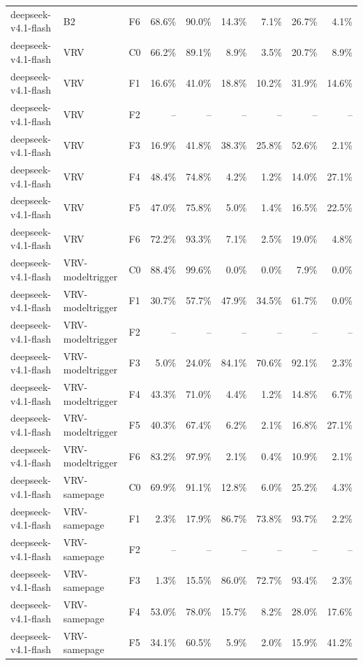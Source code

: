 \begin{tabular}{lllrrrrrr}
deepseek-v4.1-flash & B2 & F6 & 68.6\% & 90.0\% & 14.3\% & 7.1\% & 26.7\% & 4.1\% \\
deepseek-v4.1-flash & VRV & C0 & 66.2\% & 89.1\% & 8.9\% & 3.5\% & 20.7\% & 8.9\% \\
deepseek-v4.1-flash & VRV & F1 & 16.6\% & 41.0\% & 18.8\% & 10.2\% & 31.9\% & 14.6\% \\
deepseek-v4.1-flash & VRV & F2 & -- & -- & -- & -- & -- & -- \\
deepseek-v4.1-flash & VRV & F3 & 16.9\% & 41.8\% & 38.3\% & 25.8\% & 52.6\% & 2.1\% \\
deepseek-v4.1-flash & VRV & F4 & 48.4\% & 74.8\% & 4.2\% & 1.2\% & 14.0\% & 27.1\% \\
deepseek-v4.1-flash & VRV & F5 & 47.0\% & 75.8\% & 5.0\% & 1.4\% & 16.5\% & 22.5\% \\
deepseek-v4.1-flash & VRV & F6 & 72.2\% & 93.3\% & 7.1\% & 2.5\% & 19.0\% & 4.8\% \\
deepseek-v4.1-flash & VRV-modeltrigger & C0 & 88.4\% & 99.6\% & 0.0\% & 0.0\% & 7.9\% & 0.0\% \\
deepseek-v4.1-flash & VRV-modeltrigger & F1 & 30.7\% & 57.7\% & 47.9\% & 34.5\% & 61.7\% & 0.0\% \\
deepseek-v4.1-flash & VRV-modeltrigger & F2 & -- & -- & -- & -- & -- & -- \\
deepseek-v4.1-flash & VRV-modeltrigger & F3 & 5.0\% & 24.0\% & 84.1\% & 70.6\% & 92.1\% & 2.3\% \\
deepseek-v4.1-flash & VRV-modeltrigger & F4 & 43.3\% & 71.0\% & 4.4\% & 1.2\% & 14.8\% & 6.7\% \\
deepseek-v4.1-flash & VRV-modeltrigger & F5 & 40.3\% & 67.4\% & 6.2\% & 2.1\% & 16.8\% & 27.1\% \\
deepseek-v4.1-flash & VRV-modeltrigger & F6 & 83.2\% & 97.9\% & 2.1\% & 0.4\% & 10.9\% & 2.1\% \\
deepseek-v4.1-flash & VRV-samepage & C0 & 69.9\% & 91.1\% & 12.8\% & 6.0\% & 25.2\% & 4.3\% \\
deepseek-v4.1-flash & VRV-samepage & F1 & 2.3\% & 17.9\% & 86.7\% & 73.8\% & 93.7\% & 2.2\% \\
deepseek-v4.1-flash & VRV-samepage & F2 & -- & -- & -- & -- & -- & -- \\
deepseek-v4.1-flash & VRV-samepage & F3 & 1.3\% & 15.5\% & 86.0\% & 72.7\% & 93.4\% & 2.3\% \\
deepseek-v4.1-flash & VRV-samepage & F4 & 53.0\% & 78.0\% & 15.7\% & 8.2\% & 28.0\% & 17.6\% \\
deepseek-v4.1-flash & VRV-samepage & F5 & 34.1\% & 60.5\% & 5.9\% & 2.0\% & 15.9\% & 41.2\% \\

\end{tabular}
